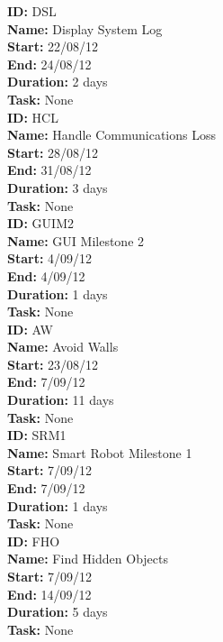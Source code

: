\documentclass[11pt, a4paper]{report}
\begin{document}
\noindent \textbf{ID:} DSL \\
\noindent \textbf{Name:} Display System Log \\
\noindent \textbf{Start:} 22/08/12 \\
\noindent \textbf{End:} 24/08/12 \\
\noindent \textbf{Duration:} 2 days \\
\noindent \textbf{Task:} None\\[0.5cm]

\noindent \textbf{ID:} HCL \\
\noindent \textbf{Name:} Handle Communications Loss \\
\noindent \textbf{Start:} 28/08/12 \\
\noindent \textbf{End:} 31/08/12 \\
\noindent \textbf{Duration:} 3 days \\
\noindent \textbf{Task:} None\\[0.5cm]

\noindent \textbf{ID:} GUIM2 \\
\noindent \textbf{Name:} GUI Milestone 2 \\
\noindent \textbf{Start:} 4/09/12 \\
\noindent \textbf{End:} 4/09/12 \\
\noindent \textbf{Duration:} 1 days \\
\noindent \textbf{Task:} None\\[0.5cm]

\noindent \textbf{ID:} AW \\
\noindent \textbf{Name:} Avoid Walls \\
\noindent \textbf{Start:} 23/08/12 \\
\noindent \textbf{End:} 7/09/12 \\
\noindent \textbf{Duration:} 11 days \\
\noindent \textbf{Task:} None\\[0.5cm]

\noindent \textbf{ID:} SRM1 \\
\noindent \textbf{Name:} Smart Robot Milestone 1 \\
\noindent \textbf{Start:} 7/09/12 \\
\noindent \textbf{End:} 7/09/12 \\
\noindent \textbf{Duration:} 1 days \\
\noindent \textbf{Task:} None\\[0.5cm]

\noindent \textbf{ID:} FHO \\
\noindent \textbf{Name:} Find Hidden Objects \\
\noindent \textbf{Start:} 7/09/12 \\
\noindent \textbf{End:} 14/09/12 \\
\noindent \textbf{Duration:} 5 days \\
\noindent \textbf{Task:} None\\[0.5cm]
\end{document}

